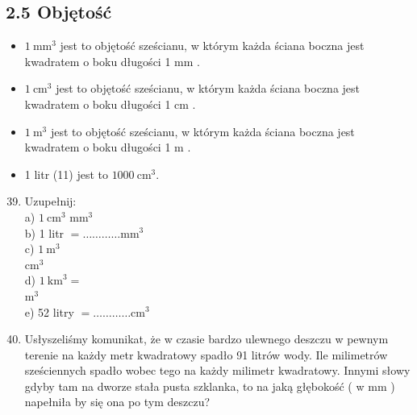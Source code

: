 \documentclass[10pt]{article}
\begin{document}
\subsection*{2.5 Objętość}
\begin{itemize}
  \item \(1 \mathrm{~mm}^{3}\) jest to objętość sześcianu, w którym każda ściana boczna jest kwadratem o boku długości 1 mm .
  \item \(1 \mathrm{~cm}^{3}\) jest to objętość sześcianu, w którym każda ściana boczna jest kwadratem o boku długości 1 cm .
  \item \(1 \mathrm{~m}^{3}\) jest to objętość sześcianu, w którym każda ściana boczna jest kwadratem o boku długości 1 m .
  \item 1 litr (11) jest to \(1000 \mathrm{~cm}^{3}\).
\end{itemize}

\begin{enumerate}
  \setcounter{enumi}{38}
  \item Uzupełnij:\\
a) \(1 \mathrm{~cm}^{3}\) \(\mathrm{mm}^{3}\)\\
b) 1 litr \(=\ldots \ldots \ldots \ldots \mathrm{mm}^{3}\)\\
c) \(1 \mathrm{~m}^{3}\)\\
\(\mathrm{cm}^{3}\)\\
d) \(1 \mathrm{~km}^{3}=\)\\
\(\mathrm{m}^{3}\)\\
e) 52 litry \(=\ldots \ldots \ldots \ldots \mathrm{cm}^{3}\)
  \item Usłyszeliśmy komunikat, że w czasie bardzo ulewnego deszczu w pewnym terenie na każdy metr kwadratowy spadło 91 litrów wody. Ile milimetrów sześciennych spadło wobec tego na każdy milimetr kwadratowy. Innymi słowy gdyby tam na dworze stała pusta szklanka, to na jaką głębokość ( w mm ) napełniła by się ona po tym deszczu?
\end{enumerate}
\end{document}
